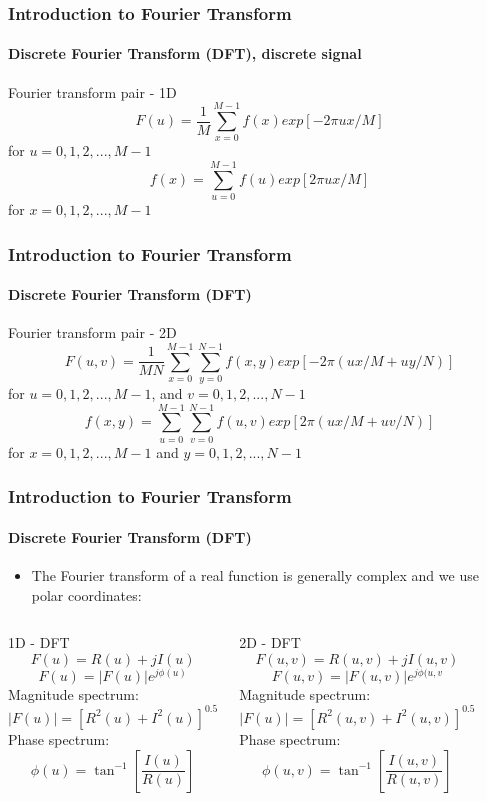 \documentclass{beamer}
\begin{document}
\begin{frame}	
\frametitle{Introduction to Fourier Transform}
\framesubtitle{Discrete Fourier Transform (DFT), discrete signal}
\begin{block}{Fourier transform pair - 1D}
\small{
	$$F(u) = \frac{1}{M}\sum^{M-1}_{x=0} f(x) exp[-2\pi ux/M]$$ \vspace{0.1cm} for $u = 0, 1, 2, ..., M-1$
	}
\small{
	$$f(x) = \sum^{M-1}_{u=0} f(u) exp[2\pi ux/M]$$ \vspace{0.1cm} for $x = 0, 1, 2, ..., M-1$
	}		
\end{block}
\end{frame}
\begin{frame}	
\frametitle{Introduction to Fourier Transform}
\framesubtitle{Discrete Fourier Transform (DFT)}
\begin{block}{Fourier transform pair - 2D}
\small{
	$$F(u,v) = \frac{1}{MN} \sum^{M-1}_{x=0}\sum^{N-1}_{y=0} f(x,y) exp[-2\pi (ux/M + uy/N)]$$ \vspace{0.1cm} for $u = 0, 1, 2, ..., M-1$, and $v = 0, 1, 2, ..., N-1$ 
	}
\small{
	$$f(x,y) = \sum^{M-1}_{u=0} \sum^{N-1}_{v=0} f(u,v) exp[2\pi (ux/M+uv/N)]$$ \vspace{0.1cm} for $x = 0, 1, 2, ..., M-1$ and $y = 0, 1, 2, ..., N-1$
	}		
\end{block}
\end{frame}
\begin{frame}
\frametitle{Introduction to Fourier Transform}
\framesubtitle{Discrete Fourier Transform (DFT)}
\begin{itemize}
	\item The Fourier transform of a real function is generally complex and we use polar coordinates: 
\end{itemize}
\begin{columns}
\begin{block}{1D - DFT}
\scriptsize{
$$F(u) = R(u)+jI(u)$$
$$F(u) = \vert F(u) \vert e^{j \phi (u)} $$
Magnitude spectrum:
$$\vert F(u) \vert = [R^{2}(u)+ I^{2}(u)]^{0.5}$$
Phase spectrum:
$$ \phi (u) = \tan^{-1} \left[ \frac{I(u)}{R(u)} \right] $$
}
\end{block}
\begin{block}{2D - DFT}
\scriptsize{
$$F(u,v) = R(u,v)+jI(u,v)$$
$$F(u,v) = \vert F(u,v) \vert e^{j \phi (u,v} $$
Magnitude spectrum:
$$\vert F(u) \vert = [R^{2}(u,v)+ I^{2}(u,v)]^{0.5}$$
Phase spectrum:
$$ \phi (u,v) = \tan^{-1} \left[ \frac{I(u,v)}{R(u,v)} \right] $$
}
\end{block}
\end{columns}			
\end{frame}
\end{document}
